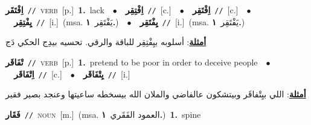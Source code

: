 \documentclass[10pt,a4paper,twoside]{article} %
\begin{document}
\begin{multicols}{2}
{\setlength\topsep{0pt}\textbf{\foreignlanguage{arabic}{اِفْتَقَر}}\ {\color{gray}\texttt{//}\color{black}}\ \textsc{verb}\ [p.]\ \textbf{1.}~lack\ \ $\bullet$\ \ \setlength\topsep{0pt}\textbf{\foreignlanguage{arabic}{اِفْتِقِر}}\ {\color{gray}\texttt{//}\color{black}}\ [c.]\ \ $\bullet$\ \ \setlength\topsep{0pt}\textbf{\foreignlanguage{arabic}{اِفْتَقِر}}\ {\color{gray}\texttt{//}\color{black}}\ [c.]\ \ $\bullet$\ \ \setlength\topsep{0pt}\textbf{\foreignlanguage{arabic}{يِفْتِقِر}}\ {\color{gray}\texttt{//}\color{black}}\ [i.]\ \color{gray}(msa. \foreignlanguage{arabic}{يَفْتَقِر}~\foreignlanguage{arabic}{\textbf{١.}})\color{black}\ \ $\bullet$\ \ \setlength\topsep{0pt}\textbf{\foreignlanguage{arabic}{يِفْتَقِر}}\ {\color{gray}\texttt{//}\color{black}}\ [i.]\ \color{gray}(msa. \foreignlanguage{arabic}{يَفْتَقِر}~\foreignlanguage{arabic}{\textbf{١.}})\color{black}\  \begin{flushright}\color{gray}\foreignlanguage{arabic}{\textbf{\underline{\foreignlanguage{arabic}{أمثلة}}}: أسلوبه بيِفْتِقِر للباقة والرقي. تحسيه بيدِج الحكي دَج}\end{flushright}\color{black}} \vspace{2mm}

{\setlength\topsep{0pt}\textbf{\foreignlanguage{arabic}{تْفَاقَر}}\ {\color{gray}\texttt{//}\color{black}}\ \textsc{verb}\ [p.]\ \textbf{1.}~pretend to be poor in order to deceive people\ \ $\bullet$\ \ \setlength\topsep{0pt}\textbf{\foreignlanguage{arabic}{اِتْفَاقَر}}\ {\color{gray}\texttt{//}\color{black}}\ [c.]\ \ $\bullet$\ \ \setlength\topsep{0pt}\textbf{\foreignlanguage{arabic}{يِتْفَاقَر}}\ {\color{gray}\texttt{//}\color{black}}\ [i.]\  \begin{flushright}\color{gray}\foreignlanguage{arabic}{\textbf{\underline{\foreignlanguage{arabic}{أمثلة}}}: اللي بيِتْفاقَر وبيتشكون عالفاضي والملان الله بيسخطه ساعيتها وعنجد بصير فقير}\end{flushright}\color{black}} \vspace{2mm}

{\setlength\topsep{0pt}\textbf{\foreignlanguage{arabic}{فَقَار}}\ {\color{gray}\texttt{//}\color{black}}\ \textsc{noun}\ [m.]\ \color{gray}(msa. \foreignlanguage{arabic}{العمود الفَقَري}~\foreignlanguage{arabic}{\textbf{١.}})\color{black}\ \textbf{1.}~spine\ } \vspace{2mm}


\end{multicols}
\end{document}
